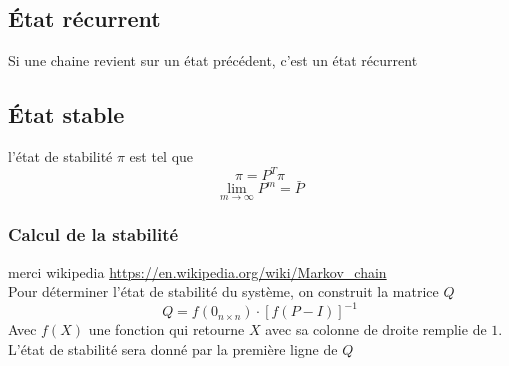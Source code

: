\documentclass[resume]{subfiles}
\begin{document}
\subsection{État récurrent}
Si une chaine revient sur un état précédent, c'est un état récurrent
\subsection{État stable}
l'état de stabilité $\pi$ est tel que
$$\pi = P^T\pi$$
$$\lim_{m\to\infty}P^m=\bar{P}$$
\subsubsection{Calcul de la stabilité}
merci wikipedia \url{https://en.wikipedia.org/wiki/Markov_chain}\\
Pour déterminer l'état de stabilité du système, on construit la matrice $Q$
$$Q=f(0_{n\times n})\cdot \left[f(P-I)\right]^{-1}$$
Avec $f(X)$ une fonction qui retourne $X$ avec sa colonne de droite remplie de $1$. L'état de stabilité sera donné par la première ligne de $Q$
\end{document}
